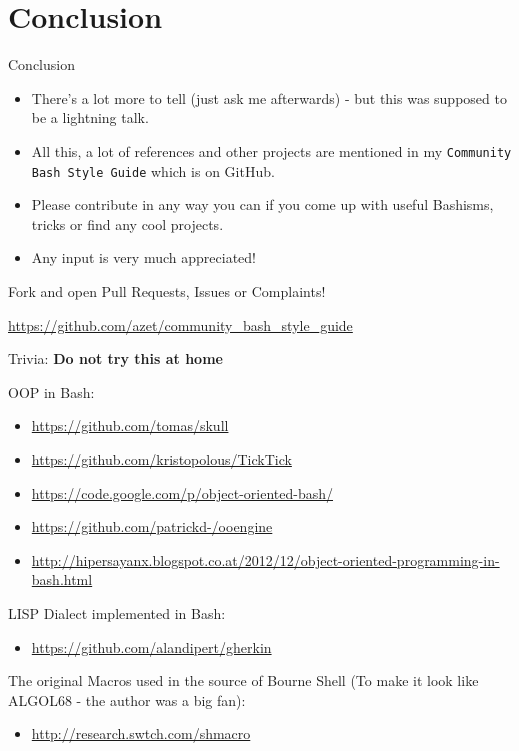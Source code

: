 \section{Conclusion}\label{conclusion}

\begin{frame}{Conclusion}

\begin{itemize}
\itemsep1pt\parskip0pt
\item
  There's a lot more to tell (just ask me afterwards) - but this was
  supposed to be a lightning talk.
\item
  All this, a lot of references and other projects are mentioned in my
  \texttt{Community Bash Style Guide} which is on GitHub.
\item
  Please contribute in any way you can if you come up with useful
  Bashisms, tricks or find any cool projects.
\item
  Any input is very much appreciated!
\end{itemize}

\begin{block}{Fork and open Pull Requests, Issues or Complaints!}

\url{https://github.com/azet/community_bash_style_guide}

\end{block}

\end{frame}

\begin{frame}{Trivia: \textbf{Do not try this at home}}

\vfill
OOP in Bash:

\begin{itemize}
\itemsep1pt\parskip0pt
\item
  \url{https://github.com/tomas/skull}
\item
  \url{https://github.com/kristopolous/TickTick}
\item
  \url{https://code.google.com/p/object-oriented-bash/}
\item
  \url{https://github.com/patrickd-/ooengine}
\item
  \url{http://hipersayanx.blogspot.co.at/2012/12/object-oriented-programming-in-bash.html}
\end{itemize}

\vfill
LISP Dialect implemented in Bash:

\begin{itemize}
\itemsep1pt\parskip0pt
\item
  \url{https://github.com/alandipert/gherkin}
\end{itemize}

\vfill

The original Macros used in the source of Bourne Shell (To make it look
like ALGOL68 - the author was a big fan):

\begin{itemize}
\itemsep1pt\parskip0pt
\item
  \url{http://research.swtch.com/shmacro}
\end{itemize}

\end{frame}

